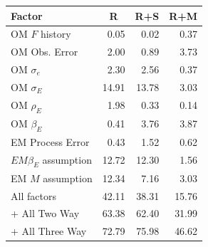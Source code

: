 \begin{center}
\begin{tabular}{lrrr}
\hline\hline
\multicolumn{1}{l}{Factor}&\multicolumn{1}{c}{R}&\multicolumn{1}{c}{R+S}&\multicolumn{1}{c}{R+M}\tabularnewline
\hline
OM $F$ history& 0.05& 0.02& 0.37\tabularnewline
OM Obs. Error& 2.00& 0.89& 3.73\tabularnewline
OM $\sigma_e$& 2.30& 2.56& 0.37\tabularnewline
OM $\sigma_E$&14.91&13.78& 3.03\tabularnewline
OM $\rho_{E}$& 1.98& 0.33& 0.14\tabularnewline
OM $\beta_{E}$& 0.41& 3.76& 3.87\tabularnewline
EM Process Error& 0.43& 1.52& 0.62\tabularnewline
$EM \beta_{E}$ assumption&12.72&12.30& 1.56\tabularnewline
EM $M$ assumption&12.34& 7.16& 3.03\tabularnewline
All factors&42.11&38.31&15.76\tabularnewline
+ All Two Way&63.38&62.40&31.99\tabularnewline
+ All Three Way&72.79&75.98&46.62\tabularnewline
\hline
\end{tabular}\end{center}
